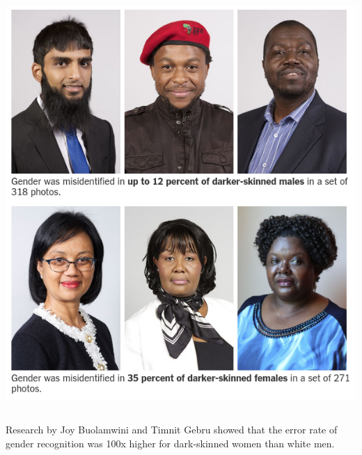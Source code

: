 \documentclass{beamer}
\begin{document}
\begin{frame}
\begin{columns}
    \begin{column}{0.45\textwidth}
        \includegraphics[width=1\textwidth]{./images/gender_race_2.png}
    \end{column}
\end{columns}
\small{Research by Joy Buolamwini and Timnit Gebru showed that the error rate of gender recognition was 100x higher for dark-skinned women than white men.}
\end{frame}

\end{document}
